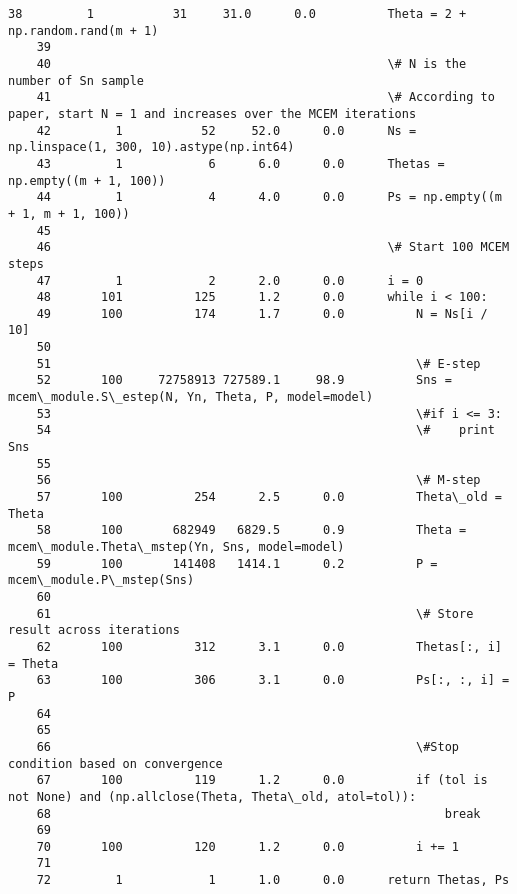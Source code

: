 \documentclass{article}
\begin{document}
\begin{Verbatim}[commandchars=\\\{\}]
    38         1           31     31.0      0.0          Theta = 2 + np.random.rand(m + 1)
    39                                           
    40                                               \# N is the number of Sn sample
    41                                               \# According to paper, start N = 1 and increases over the MCEM iterations
    42         1           52     52.0      0.0      Ns = np.linspace(1, 300, 10).astype(np.int64)
    43         1            6      6.0      0.0      Thetas = np.empty((m + 1, 100))
    44         1            4      4.0      0.0      Ps = np.empty((m + 1, m + 1, 100))
    45                                           
    46                                               \# Start 100 MCEM steps
    47         1            2      2.0      0.0      i = 0
    48       101          125      1.2      0.0      while i < 100:
    49       100          174      1.7      0.0          N = Ns[i / 10]
    50                                           
    51                                                   \# E-step
    52       100     72758913 727589.1     98.9          Sns = mcem\_module.S\_estep(N, Yn, Theta, P, model=model)
    53                                                   \#if i <= 3:
    54                                                   \#    print Sns
    55                                           
    56                                                   \# M-step
    57       100          254      2.5      0.0          Theta\_old = Theta
    58       100       682949   6829.5      0.9          Theta = mcem\_module.Theta\_mstep(Yn, Sns, model=model)
    59       100       141408   1414.1      0.2          P = mcem\_module.P\_mstep(Sns)
    60                                           
    61                                                   \# Store result across iterations
    62       100          312      3.1      0.0          Thetas[:, i] = Theta
    63       100          306      3.1      0.0          Ps[:, :, i] = P
    64                                           
    65                                                   
    66                                                   \#Stop condition based on convergence
    67       100          119      1.2      0.0          if (tol is not None) and (np.allclose(Theta, Theta\_old, atol=tol)):
    68                                                       break
    69                                           
    70       100          120      1.2      0.0          i += 1
    71                                           
    72         1            1      1.0      0.0      return Thetas, Ps
    \end{Verbatim}
\end{document}
